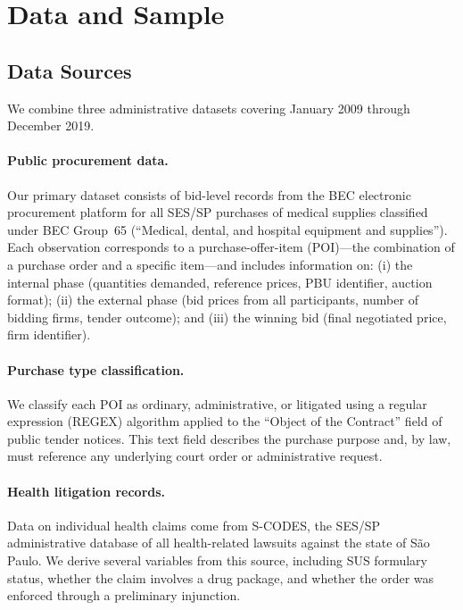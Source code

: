 \section{Data and Sample}
\label{sec:data}

\subsection{Data Sources}

We combine three administrative datasets covering January 2009 through December 2019.

\paragraph{Public procurement data.}
Our primary dataset consists of bid-level records from the BEC electronic procurement platform for all SES/SP purchases of medical supplies classified under BEC Group~65 (``Medical, dental, and hospital equipment and supplies''). Each observation corresponds to a purchase-offer-item (POI)---the combination of a purchase order and a specific item---and includes information on: (i) the internal phase (quantities demanded, reference prices, PBU identifier, auction format); (ii) the external phase (bid prices from all participants, number of bidding firms, tender outcome); and (iii) the winning bid (final negotiated price, firm identifier).

\paragraph{Purchase type classification.}
We classify each POI as ordinary, administrative, or litigated using a regular expression (REGEX) algorithm applied to the ``Object of the Contract'' field of public tender notices. This text field describes the purchase purpose and, by law, must reference any underlying court order or administrative request.

\paragraph{Health litigation records.}
Data on individual health claims come from S-CODES, the SES/SP administrative database of all health-related lawsuits against the state of S\~ao Paulo. We derive several variables from this source, including SUS formulary status, whether the claim involves a drug package, and whether the order was enforced through a preliminary injunction.

